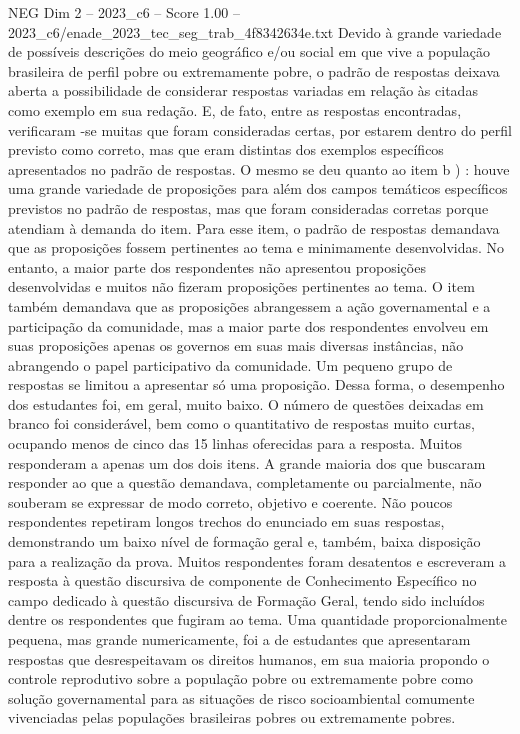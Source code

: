 \begin{textsample}{NEG Dim 2 – 2023\_c6 – Score 1.00 – 2023\_c6/enade\_2023\_tec\_seg\_trab\_4f8342634e.txt}
Devido à grande variedade de possíveis descrições do meio geográfico e/ou social em que vive a população brasileira de perfil pobre ou extremamente pobre, o padrão de respostas deixava aberta a possibilidade de considerar respostas variadas em relação às citadas como exemplo em sua redação.
E, de fato, entre as respostas encontradas, verificaram -se muitas que foram consideradas certas, por estarem dentro do perfil previsto como correto, mas que eram distintas dos exemplos específicos apresentados no padrão de respostas.
O mesmo se deu quanto ao item b ) : houve uma grande variedade de proposições para além dos campos temáticos específicos previstos no padrão de respostas, mas que foram consideradas corretas porque atendiam à demanda do item.
Para esse item, o padrão de respostas demandava que as proposições fossem pertinentes ao tema e minimamente desenvolvidas.
No entanto, a maior parte dos respondentes não apresentou proposições desenvolvidas e muitos não fizeram proposições pertinentes ao tema.
O item também demandava que as proposições abrangessem a ação governamental e a participação da comunidade, mas a maior parte dos respondentes envolveu em suas proposições apenas os governos em suas mais diversas instâncias, não abrangendo o papel participativo da comunidade.
Um pequeno grupo de respostas se limitou a apresentar só uma proposição.
Dessa forma, o desempenho dos estudantes foi, em geral, muito baixo.
O número de questões deixadas em branco foi considerável, bem como o quantitativo de respostas muito curtas, ocupando menos de cinco das 15 linhas oferecidas para a resposta.
Muitos responderam a apenas um dos dois itens.
A grande maioria dos que buscaram responder ao que a questão demandava, completamente ou parcialmente, não souberam se expressar de modo correto, objetivo e coerente.
Não poucos respondentes repetiram longos trechos do enunciado em suas respostas, demonstrando um baixo nível de formação geral e, também, baixa disposição para a realização da prova.
Muitos respondentes foram desatentos e escreveram a resposta à questão discursiva de componente de Conhecimento Específico no campo dedicado à questão discursiva de Formação Geral, tendo sido incluídos dentre os respondentes que fugiram ao tema.
Uma quantidade proporcionalmente pequena, mas grande numericamente, foi a de estudantes que apresentaram respostas que desrespeitavam os direitos humanos, em sua maioria propondo o controle reprodutivo sobre a população pobre ou extremamente pobre como solução governamental para as situações de risco socioambiental comumente vivenciadas pelas populações brasileiras pobres ou extremamente pobres.

\end{textsample}
